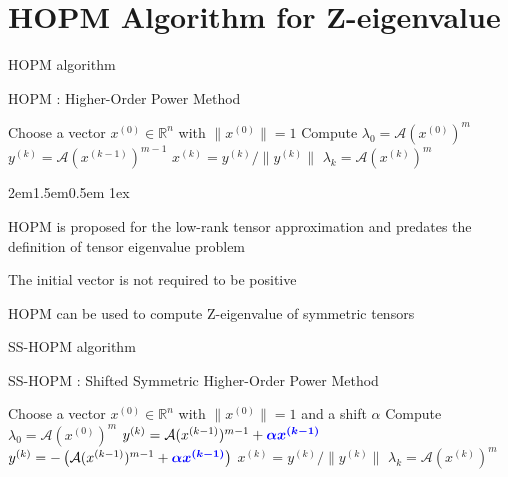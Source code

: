 \documentclass[10pt,compress,t,noamsthm,notheorem,table,handout]{beamer}
\newcommand{\Bullet}{{\fontsize{6pt}{6pt}\selectfont\CircleSolid}}
\newcommand{\zhu}{{\color{blue!40}\Bullet}}
\newenvironment{blist}%
    {\begin{list}{{\hfill\raisebox{1.12pt}{\color{blue!60}\zhu}}}{%
     \leftmargin2em\labelwidth1.5em\labelsep0.5em
     \itemsep1ex\itemindent0pt\parsep0pt\topsep0pt}}
    {\end{list}}
\theoremstyle{nonumberbreak}%
\newcommand{\myem}[2][blue]{{\color{#1} #2}}
\newcommand{\lam}{\lambda}
\newcommand{\mycite}[1]{\textcolor{red}{\normalfont\upshape{#1}}}
\newcommand{\R}{\mathbb{R}}
\newcommand{\A}{\mathcal{A}}
\newcommand{\al}{\alpha}
\begin{document}
\section{HOPM Algorithm for Z-eigenvalue}

\begin{frame}{HOPM algorithm}

HOPM \mycite{[LMV '00]} : Higher-Order Power Method

\begin{Block}\linespread{1.5}\selectfont
  \begin{algorithmic}[1]
  \State Choose a vector $x^{(0)}\in \R^n$ with $\|x^{(0)}\|=1$
  \State Compute $\lam_0=\A (x^{(0)})^m$
  \State $y^{(k)}=\A (x^{(k-1)})^{m-1}$
  \State $x^{(k)}= {y^{(k)}}/{\|y^{(k)}\|}$\smallskip
  \State $\lam_{k}=\A (x^{(k)})^m$
  \EndFor
  \end{algorithmic}
\end{Block}

\begin{blist}
  \item HOPM is proposed for the low-rank tensor approximation
   and predates the definition of tensor eigenvalue problem
  \item The initial vector is not required to be positive
  
  \item HOPM can be used to compute \myem{Z-eigenvalue} of symmetric tensors
\end{blist}

\end{frame}


\begin{frame}{SS-HOPM algorithm}

SS-HOPM \mycite{[KM '11]} : Shifted Symmetric Higher-Order Power Method

\begin{Block}\linespread{1.4}\selectfont
  \begin{algorithmic}[1]
  \State Choose a vector $x^{(0)}\in \R^n$ with $\|x^{(0)}\|=1$
    and a shift $\alpha$
  \State Compute $\lam_0=\A (x^{(0)})^m$
  \If{$\al\geq0$}
  \State $y^{(k)}=\A (x^{(k-1)})^{m-1}+\myem{\bm{\alpha x^{(k-1)}}}$
  \Else
  \State $y^{(k)}=-\left(\A (x^{(k-1)})^{m-1}+\myem{\bm{\alpha x^{(k-1)}}}\right)$
  \EndIf
  \State $x^{(k)}=y^{(k)}/\|y^{(k)}\|$
  \State $\lam_{k}=\A (x^{(k)})^m$
  \EndFor
  \end{algorithmic}
\end{Block}

\end{frame}
\end{document}
